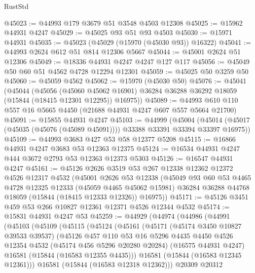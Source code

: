 \begin{lexlean}{RustStd}
\begin{coremodule}
@45023 := @44993 @179 @3679 @51 @3548 @4503 @12308
@45025 := @15962 @44931 @4247
@45029 := @45025 @93 @51 @93 @4503
@45030 := @15971 @44931
@45035 := @45023 (@45029 (@15970 (@45030 @93)) @16322)
@45041 := @44993 @2624 @612 @51 @814 @12306 @5667
@45044 := @45001 @2624 @51 @12306
@45049 := @18336 @44931 @4247 @4247 @127 @117
@45056 := @45049 @50 @60 @51 @4562 @4728 @12294 @12301
@45059 := @45025 @50 @3259 @50
@45060 := @45059 @4562
@45062 := @15970 (@45030 @50)
@45076 := @45041
    (@45044
      (@45056
        (@45060 @45062 @16901)
        @36284
        @36288
        @36292
        @18059
        (@15844 (@18415 @12301 @12295))
        @16975))
@45089 := @44993 @610 @110 @557 @16 @5665 @4450 (@21688 @44931 @4247 @607 @557 @5664 @21700)
@45091 := @15855 @44931 @4247
@45103 := @44999
    (@45004 (@45014 (@45017 (@45035 (@45076 (@45089 @45091)))) @33388 @33391 @33394 @33397 @16975))
@45109 := @44993 @3683 @427 @53 @58 @12377 @5208
@45115 := @16866 @44931 @4247 @3683 @53 @12363 @12375
@45124 := @16534 @44931 @4247 @444 @3672 @2793 @53 @12363 @12373 @5303
@45126 := @16547 @44931 @4247
@45161 := @45126
    @2626
    @3519
    @53
    @267
    @12338
    @12362
    @12372
    @4526
    @12317
    @4532
    (@45001
      @2626
      @53
      @12338
      (@45049
        @93
        @60
        @53
        @4465
        @4728
        @12325
        @12333
        (@45059 @4465 @45062 @15981)
        @36284
        @36288
        @44768
        @18059
        (@15844 (@18415 @12333 @12326))
        @16975))
@45171 := @45126 @3451 @459 @53 @266 @10827 @12361 @12371 @4526 @12344 @4532
@45174 := @15831 @44931 @4247 @53
@45259 := @44929
    (@44974
      (@44986
        (@44991
          (@45103
            (@45109
              (@45115
                (@45124
                  (@45161
                    (@45171
                      (@45174 @3450 @10827 @39533 @39537)
                      (@45126
                        @457
                        @110
                        @53
                        @16
                        @5296
                        @4435
                        @4450
                        @4526
                        @12354
                        @4532
                        (@45174 @456 @5296 @20280 @20284)
                        (@16575 @44931 @4247)
                        @16581
                        (@15844 (@16583 @12355 @4435)))
                      @16581
                      (@15844 (@16583 @12345 @12361)))
                    @16581
                    (@15844 (@16583 @12318 @12362)))
                  @20309
                  @20312

\end{coremodule}
\end{lexlean}
